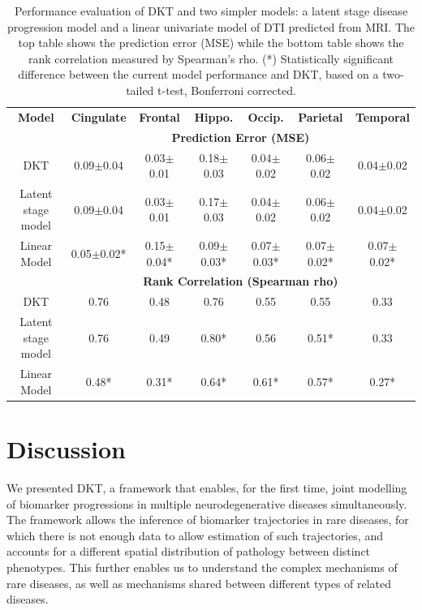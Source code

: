 \documentclass{llncs}
\begin{document}
\begin{table}
\footnotesize
\begin{tabular}{c | c c c c c c}
\textbf{Model} & \textbf{Cingulate} & \textbf{Frontal} & \textbf{Hippo.} & \textbf{Occip.} & \textbf{Parietal} & \textbf{Temporal}\\
& \multicolumn{6}{c}{\textbf{Prediction Error (MSE)}}\\
DKT & 0.09$\pm$0.04 & 0.03$\pm$0.01 & 0.18$\pm$0.03 & 0.04$\pm$0.02 & 0.06$\pm$0.02 & 0.04$\pm$0.02\\
Latent stage model & 0.09$\pm$0.04 & 0.03$\pm$0.01 & 0.17$\pm$0.03 & 0.04$\pm$0.02 & 0.06$\pm$0.02 & 0.04$\pm$0.02\\
Linear Model & 0.05$\pm$0.02* & 0.15$\pm$0.04* & 0.09$\pm$0.03* & 0.07$\pm$0.03* & 0.07$\pm$0.02* & 0.07$\pm$0.02*\\
& \multicolumn{6}{c}{\textbf{Rank Correlation (Spearman rho)}}\\
DKT  & 0.76  & 0.48  & 0.76  & 0.55  & 0.55  & 0.33 \\
Latent stage model  & 0.76  & 0.49  & 0.80*  & 0.56  & 0.51*  & 0.33 \\
Linear Model  & 0.48*  & 0.31*  & 0.64*  & 0.61*  & 0.57*  & 0.27* \\
\end{tabular}
\normalfont
\caption[Performance evaluation of DKT and two simpler models]{Performance evaluation of DKT and two simpler models: a latent stage disease progression model and a linear univariate model of DTI predicted from MRI. The top table shows the prediction error (MSE) while the bottom table shows the rank correlation measured by Spearman's rho. (*) Statistically significant difference between the current model performance and DKT, based on a two-tailed t-test, Bonferroni corrected.}
\label{sec:dktPerfMetrics}
\end{table}

\section{Discussion}
\label{sec:dktDis}

We presented DKT, a framework that enables, for the first time, joint modelling of biomarker progressions in multiple neurodegenerative diseases simultaneously. The framework allows the inference of biomarker trajectories in rare diseases, for which there is not enough data to allow estimation of such trajectories, and accounts for a different spatial distribution of pathology between distinct phenotypes. This further enables us to understand the complex mechanisms of rare diseases, as well as mechanisms shared between different types of related diseases.
\end{document}
